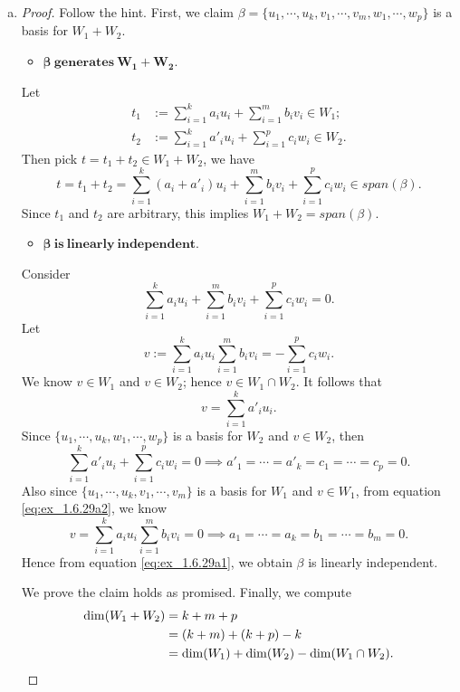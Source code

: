 \begin{Exercise}
\begin{enumerate}[(a)]
\item
\begin{proof}
Follow the hint. First, we claim $\beta = \{u_1,\cdots,u_k,v_1,\cdots,v_m,w_1,\cdots,w_p\}$ is a basis for $W_1+W_2$. 
\begin{itemize}
\item $\mathbf{\boldsymbol{\beta}\ generates\ W_1+W_2}$.
\end{itemize}
Let 
\begin{align*}
t_1 &:= \sum_{i=1}^{k}a_i u_i + \sum_{i=1}^{m}b_i v_i\in W_1; \\
t_2 &:= \sum_{i=1}^{k}a'_i u_i + \sum_{i=1}^{p}c_i w_i\in W_2.
\end{align*}
Then pick $t = t_1+t_2 \in W_1+W_2$, we have 
$$
t = t_1+t_2 = \sum_{i=1}^{k}(a_i+a'_i) u_i + \sum_{i=1}^{m}b_i v_i + \sum_{i=1}^{p}c_i w_i \in span(\beta).
$$
Since $t_1$ and $t_2$ are arbitrary, this implies $W_1+W_2 =  span(\beta)$.

\begin{itemize}
\item $\mathbf{\boldsymbol{\beta}\ is\ linearly\ independent}$.
\end{itemize}
Consider
\begin{equation}\label{eq:ex_1.6.29a1}
\sum_{i=1}^{k}a_i u_i + \sum_{i=1}^{m}b_i v_i + \sum_{i=1}^{p}c_i w_i = 0.
\end{equation}
Let
\begin{equation}\label{eq:ex_1.6.29a2}
v := \sum_{i=1}^{k}a_i u_i \sum_{i=1}^{m}b_i v_i = -\sum_{i=1}^{p}c_i w_i.
\end{equation}
We know $v\in W_1$ and $v\in W_2$; hence $v\in W_1\cap W_2$. It follows that
$$
v = \sum_{i=1}^{k}a'_i u_i.
$$
Since $\{u_1, \cdots, u_k, w_1, \cdots, w_p\}$ is a basis for $W_2$ and $v\in W_2$, then
$$
\sum_{i=1}^{k}a'_i u_i + \sum_{i=1}^{p}c_i w_i = 0
\implies
a'_1 = \cdots = a'_k = c_1 = \cdots = c_p = 0.
$$
Also since $\{u_1, \cdots, u_k, v_1, \cdots, v_m\}$ is a basis for $W_1$ and $v\in W_1$, from equation \eqref{eq:ex_1.6.29a2}, we know
$$
v = \sum_{i=1}^{k}a_i u_i \sum_{i=1}^{m}b_i v_i = 0
\implies
a_1 = \cdots = a_k = b_1 = \cdots = b_m = 0.
$$
Hence from equation \eqref{eq:ex_1.6.29a1}, we obtain $\beta$ is linearly independent.

We prove the claim holds as promised. Finally, we compute
\begin{align}
\dim(W_1+W_2) 
&= k+m+p \notag \\
&= (k+m) + (k+p) - k \notag \\
&= \dim(W_1) + \dim(W_2) - \dim(W_1\cap W_2). \label{eq:ex_1.6.29a3}
\end{align}


\end{proof}
\end{enumerate}
\end{Exercise}
